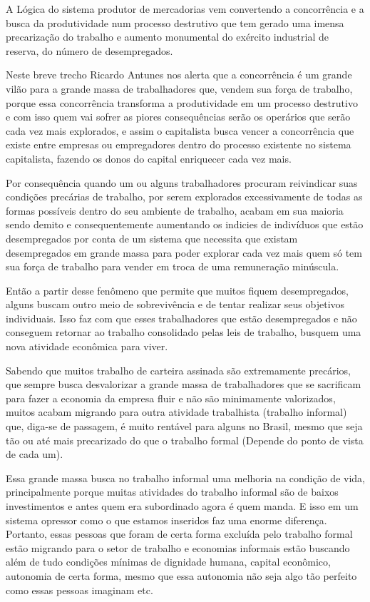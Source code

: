 \begin{citacao}
A Lógica do sistema produtor de mercadorias vem convertendo a concorrência e a busca da produtividade 
num processo destrutivo que tem gerado uma imensa precarização do trabalho e aumento monumental do 
exército industrial de reserva, do número de desempregados. \cite{antunes1999sentidos} 
\end{citacao}

Neste breve trecho Ricardo Antunes \cite{antunes1999sentidos} nos alerta que a concorrência é um grande vilão para a 
grande massa de trabalhadores que, vendem sua força de trabalho, porque essa concorrência transforma 
a produtividade em um processo destrutivo e com isso quem vai sofrer as piores consequências serão 
os operários que serão cada vez mais explorados, e assim o capitalista busca vencer a concorrência 
que existe entre empresas ou empregadores dentro do processo existente no sistema capitalista, 
fazendo os donos do capital enriquecer cada vez mais.

Por consequência quando um ou alguns trabalhadores procuram reivindicar suas condições precárias 
de trabalho, por serem explorados excessivamente de todas as formas possíveis dentro do seu ambiente 
de trabalho, acabam em sua maioria sendo demito e consequentemente aumentando os indicies de indivíduos 
que estão desempregados por conta de um sistema que necessita que existam desempregados em grande 
massa para poder explorar cada vez mais quem só tem sua força de trabalho para vender em troca de uma 
remuneração minúscula. 

Então a partir desse fenômeno que permite que muitos fiquem desempregados, alguns buscam outro meio de 
sobrevivência e de tentar realizar seus objetivos individuais. Isso faz com que esses trabalhadores que 
estão desempregados e não conseguem retornar ao trabalho consolidado pelas leis de trabalho, busquem 
uma nova atividade econômica para viver. 

Sabendo que muitos trabalho de carteira assinada são extremamente 
precários, que sempre busca desvalorizar a grande massa de trabalhadores que se sacrificam para fazer 
a economia da empresa fluir e não são minimamente valorizados, muitos acabam migrando para outra atividade 
trabalhista (trabalho informal) que, diga-se de passagem, é muito rentável para alguns no Brasil, mesmo 
que seja tão ou até mais precarizado do que o trabalho formal (Depende do ponto de vista de cada um). 

Essa grande massa busca no trabalho informal uma melhoria na condição de vida, principalmente porque 
muitas atividades do trabalho informal são de baixos investimentos e antes quem era subordinado agora 
é quem manda. E isso em um sistema opressor como o que estamos inseridos faz uma enorme diferença. 
Portanto, essas pessoas que foram de certa forma excluída pelo trabalho formal estão migrando para o 
setor de trabalho e economias informais estão buscando além de tudo condições mínimas de dignidade 
humana, capital econômico, autonomia de certa forma, mesmo que essa autonomia não seja algo tão 
perfeito como essas pessoas imaginam etc.

